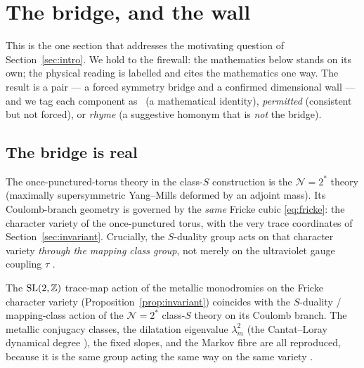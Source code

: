 \section{The bridge, and the wall}
\label{sec:bridge}

This is the one section that addresses the motivating question of
Section~\ref{sec:intro}. We hold to the firewall: the mathematics below stands on its own;
the physical reading is labelled and cites the mathematics one way. The result is a pair
--- a forced symmetry bridge and a confirmed dimensional wall --- and we tag each
component as \sForced\ (a mathematical identity), \emph{permitted} (consistent but not
forced), or \emph{rhyme} (a suggestive homonym that is \emph{not} the bridge).

\subsection{The bridge is real}

The once-punctured-torus theory in the class-$S$ construction is the
$\mathcal{N}=2^\ast$ theory (maximally supersymmetric Yang--Mills deformed by an adjoint
mass). Its Coulomb-branch geometry is governed by the \emph{same} Fricke cubic
\eqref{eq:fricke}: the character variety of the once-punctured torus, with the very trace
coordinates of Section~\ref{sec:invariant}. Crucially, the $S$-duality group acts on that
character variety \emph{through the mapping class group}, not merely on the ultraviolet
gauge coupling $\tau$ \cite{allegrettishan2024}.

\begin{theorem}\label{thm:bridge}
The $\mathrm{SL}(2,\mathbb{Z})$ trace-map action of the metallic monodromies on the Fricke character
variety (Proposition~\ref{prop:invariant}) coincides with the $S$-duality /
mapping-class action of the $\mathcal{N}=2^\ast$ class-$S$ theory on its Coulomb branch.
The metallic conjugacy classes, the dilatation eigenvalue $\lambda_m^2$ (the Cantat--Loray
dynamical degree \cite{cantatloray2009}), the fixed slopes, and the Markov fibre are all
reproduced, because it is the same group acting the same way on the same variety
\cite{allegrettishan2024,gmn2013}.
\end{theorem}

